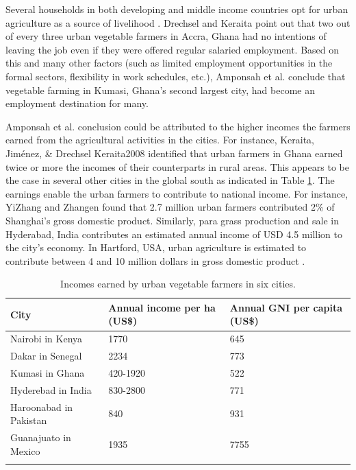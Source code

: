 Several households in both developing and middle income countries opt for urban agriculture as a source of livelihood \cite {Amoah2007}. Drechsel and Keraita \cite{Drechsel2014} point out that two out of every three urban vegetable farmers in Accra, Ghana had no intentions of leaving the job even if they were offered regular salaried employment. Based on this and many other factors (such as limited employment opportunities in the formal sectors, flexibility in work schedules, etc.), Amponsah et al. \cite{Amponsah2015} conclude that vegetable farming in Kumasi, Ghana's second largest city, had become an employment destination for many.

Amponsah et al. \cite{Amponsah2015} conclusion could be attributed to the higher incomes the farmers earned from the agricultural activities in the cities. For instance, Keraita, Jiménez, \& Drechsel Keraita2008 identified that urban farmers in Ghana earned twice or more the incomes of their counterparts in rural areas. This appears to be the case in several other cities in the global south as indicated in Table \ref{tbl:incomesByUfarmens}. The earnings enable the urban farmers to contribute to national income. For instance, YiZhang and Zhangen \cite{YiZhang2000} found that 2.7 million urban farmers contributed 2\% of Shanghai's gross domestic product. Similarly, para grass production and sale in Hyderabad, India contributes an estimated annual income of USD 4.5 million to the city's economy. In Hartford, USA, urban agriculture is estimated to contribute between 4 and 10 million dollars in gross domestic product \cite{Nugent2000}.

\begin{table}[th]
\caption{Incomes earned by urban vegetable farmers in six cities. \cite{Keraita2008, Drechsel2014, Buechler2005}}
\begin{center}
\begin{tabular}{ p{} p{} p{} } 
\hline
City & Annual income per ha (US\$) & Annual GNI per capita (US\$) \\
\hline
Nairobi in Kenya & 1770 & 645 \\
Dakar in Senegal & 2234 & 773 \\
Kumasi in Ghana & 420-1920 & 522 \\
Hyderebad in India & 830-2800 & 771 \\
Haroonabad in Pakistan & 840 & 931 \\
Guanajuato in Mexico & 1935 & 7755 \\
\hline
\label{tbl:incomesByUfarmens}
\end{tabular}
\end{center}
\end{table}

